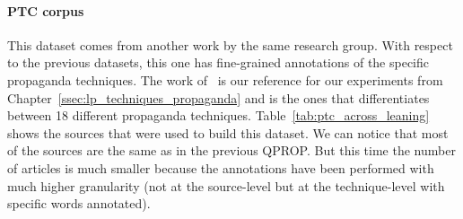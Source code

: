 \paragraph{PTC corpus}
This dataset comes from another work by the same research group.
With respect to the previous datasets, this one has fine-grained annotations of the specific propaganda techniques. The work of~\citet{da2019fine} is our reference for our experiments from Chapter~\ref{ssec:lp_techniques_propaganda} and is the ones that differentiates between 18 different propaganda techniques.
Table~\ref{tab:ptc_across_leaning} shows the sources that were used to build this dataset. We can notice that most of the sources are the same as in the previous QPROP. But this time the number of articles is much smaller because the annotations have been performed with much higher granularity (not at the source-level but at the technique-level with specific words annotated).

